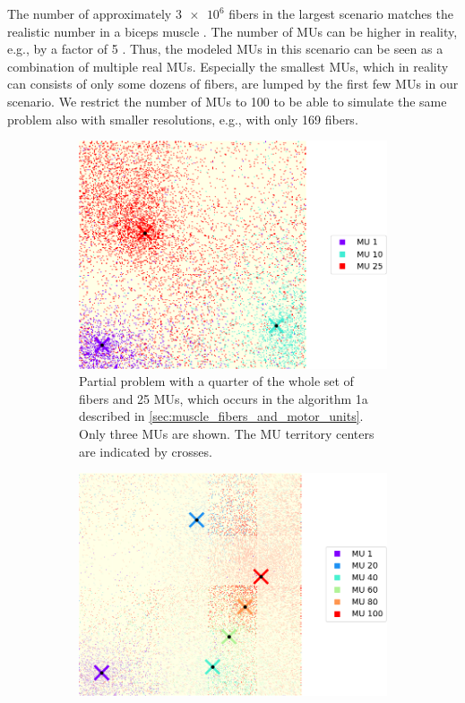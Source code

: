 The number of approximately $\num{3e6}$ fibers in the largest scenario matches the realistic number in a biceps muscle \cite{MacDougall1984}. The number of MUs can be higher in reality, e.g., by a factor of 5 \cite{Feinstein1955,MacIntosh2006}. Thus, the modeled MUs in this scenario can be seen as a combination of multiple real MUs. Especially the smallest MUs, which in reality can consists of only some dozens of fibers, are lumped by the first few MUs in our scenario. We restrict the number of MUs to 100 to be able to simulate the same problem also with smaller resolutions, e.g., with only 169 fibers.

\begin{figure}
  \centering%
  \begin{subfigure}[t]{0.47\textwidth}%
    \centering%
    \includegraphics[width=\textwidth]{images/results/application/MU_fibre_distribution_523x523_100mus_txt_0_2d_fiber_distribution_.png}%
    \caption{Partial problem with a quarter of the whole set of fibers and 25 MUs, which occurs in the algorithm 1a described in \cref{sec:muscle_fibers_and_motor_units}. Only three MUs are shown. The MU territory centers are indicated by crosses.}%
    \label{fig:mu_assignment_part0}%
  \end{subfigure} \quad
  \begin{subfigure}[t]{0.47\textwidth}%
    \centering%
    \includegraphics[width=\textwidth]{images/results/application/MU_fibre_distribution_523x523_100mus_txt_2d_fiber_distribution_.png}%

\end{subfigure}
\end{figure}
